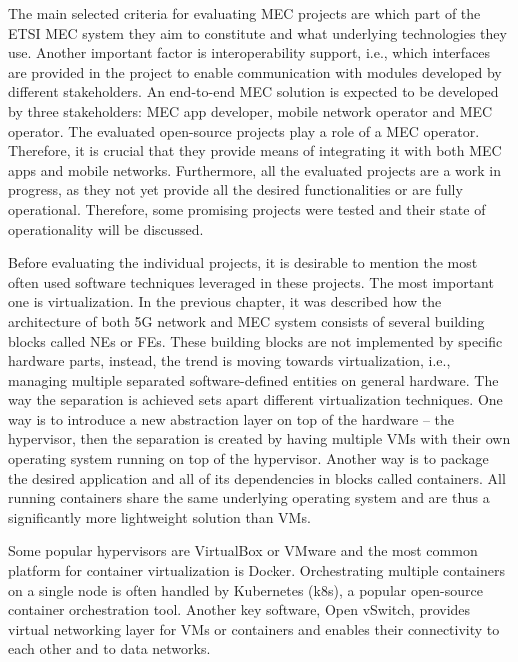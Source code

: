 \documentclass[12pt,a4paper,twoside]{report}
\begin{document}
The main selected criteria for evaluating MEC projects are which part of the ETSI MEC system they aim to constitute and what underlying technologies they use. Another important factor is interoperability support, i.e., which interfaces are provided in the project to enable communication with modules developed by different stakeholders. An end-to-end MEC solution is expected to be developed by three stakeholders: MEC app developer, mobile network operator and MEC operator. The evaluated open-source projects play a role of a MEC operator. Therefore, it is crucial that they provide means of integrating it with both MEC apps and mobile networks. Furthermore, all the evaluated projects are a work in progress, as they not yet provide all the desired functionalities or are fully operational. Therefore, some promising projects were tested and their state of operationality will be discussed.

Before evaluating the individual projects, it is desirable to mention the most often used software techniques leveraged in these projects. The most important one is virtualization. In the previous chapter, it was described how the architecture of both 5G network and MEC system consists of several building blocks called NEs or FEs. These building blocks are not implemented by specific hardware parts, instead, the trend is moving towards virtualization, i.e., managing multiple separated software-defined entities on general hardware. The way the separation is achieved sets apart different virtualization techniques. One way is to introduce a new abstraction layer on top of the hardware – the hypervisor, then the separation is created by having multiple VMs with their own operating system running on top of the hypervisor. Another way is to package the desired application and all of its dependencies in blocks called containers. All running containers share the same underlying operating system and are thus a significantly more lightweight solution than VMs.

Some popular hypervisors are VirtualBox or VMware and the most common platform for container virtualization is Docker. Orchestrating multiple containers on a single node is often handled by Kubernetes (k8s), a popular open-source container orchestration tool. Another key software, Open vSwitch, provides virtual networking layer for VMs or containers and enables their connectivity to each other and to data networks.
\end{document}
